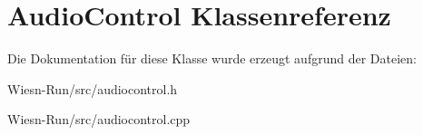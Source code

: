 \hypertarget{classAudioControl}{\section{Audio\-Control Klassenreferenz}
\label{classAudioControl}
}


Die Dokumentation für diese Klasse wurde erzeugt aufgrund der Dateien\-:\begin{DoxyCompactItemize}
\item 
Wiesn-\/\-Run/src/audiocontrol.\-h\item 
Wiesn-\/\-Run/src/audiocontrol.\-cpp\end{DoxyCompactItemize}
